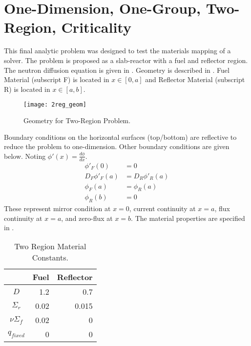 \section{One-Dimension, One-Group, Two-Region, Criticality}
  This final analytic problem was designed to test the materials mapping of a
  solver. The problem is proposed as a slab-reactor with a fuel and  reflector
  region. The neutron diffusion equation is given in  . 
  Geometry is described in . Fuel Material (subscript F) 
  is located in $x \in [0,a]$ and Reflector Material (subscript R) is located in
  $x \in [a,b]$.
  \begin{figure}
    \centering
    \texttt{[image: 2reg\_geom]}
    \caption{Geometry for Two-Region Problem.}
    \label{fig:2reg_geom}
  \end{figure}
  Boundary conditions on the horizontal surfaces (top/bottom) are reflective
  to reduce the problem to one-dimension. Other boundary conditions are given
  below. Noting $\phi'(x) = \frac{d \phi}{dx}$.
  \begin{align}
    \label{eq:2reg_mirror}
    \phi'_F(0)&=0\\
    \label{eq:2reg_continuity}
    D_F\phi'_F(a)&=D_R\phi'_R(a) \\
    \label{eq:2reg_fluxcontinuity}
    \phi_F(a) &= \phi_R(a) \\
    \label{eq:2reg_zeroflux}
    \phi_R(b)&=0
  \end{align}
  These represent mirror condition at $x=0$, current continuity at $x=a$, flux
  continuity at $x=a$, and zero-flux at $x=b$. The material properties are 
  specified in .
  \begin{table}
    \caption{Two Region Material Constants.}
    \label{tab:2reg_constants}
    \begin{center}
      \begin{tabular}{crr}
        \toprule
        & Fuel & Reflector \\
        \midrule
        $D$ & 1.2 & 0.7 \\
        $\Sigma_r$ & 0.02 & 0.015 \\
        $\nu \Sigma_f$ & 0.02 & 0 \\
        $q_{fixed}$ & 0 & 0 \\
        \bottomrule
      \end{tabular}
    \end{center}
  \end{table}
  
